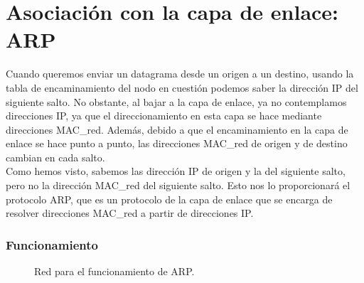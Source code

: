 \section{Asociación con la capa de enlace: \acrfull{ARP}}
Cuando queremos enviar un datagrama desde un origen a un destino, usando la tabla de encaminamiento del nodo en cuestión podemos saber la dirección IP del siguiente salto. No obstante, al bajar a la capa de enlace, ya no contemplamos direcciones IP\@, ya que el direccionamiento en esta capa se hace mediante direcciones \acrshort{MAC_red}. Además, debido a que el encaminamiento en la capa de enlace se hace punto a punto, las direcciones \acrshort{MAC_red} de origen y de destino cambian en cada salto.\\

Como hemos visto, sabemos las dirección IP de origen y la del siguiente salto, pero no la dirección \acrshort{MAC_red} del siguiente salto. Esto nos lo proporcionará el protocolo \acrshort{ARP}, que es un protocolo de la capa de enlace que se encarga de resolver direcciones \acrshort{MAC_red} a partir de direcciones IP\@.

\subsubsection{Funcionamiento}

\begin{figure}
    \centering
    \caption{Red para el funcionamiento de \acrshort{ARP}.}
    \label{fig:arp}
\end{figure}

